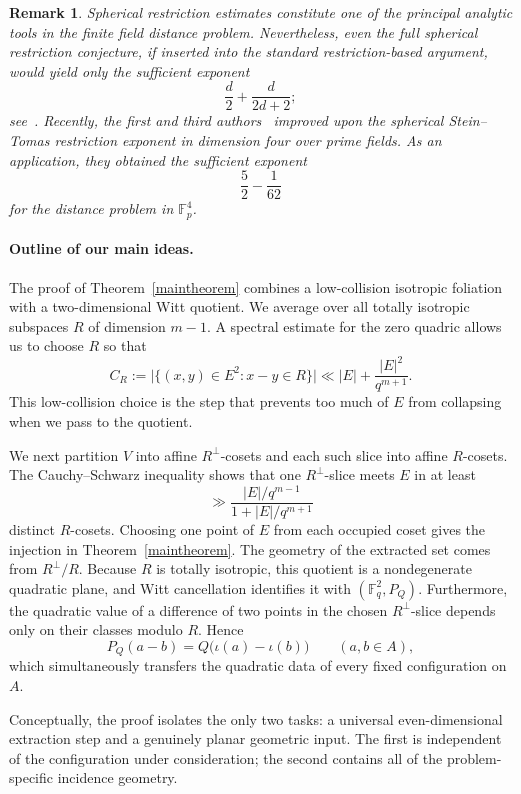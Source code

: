 \documentclass[11pt]{article}
\newtheorem{remark}[theorem]{Remark}
\newcommand{\F}{\mathbb F}
\begin{document}
\begin{remark}
Spherical restriction estimates constitute one of the principal
analytic tools in the finite field distance problem. Nevertheless,
even the full spherical restriction conjecture, if inserted into the
standard restriction-based argument, would yield only the sufficient
exponent
\[
    \frac{d}{2}+\frac{d}{2d+2};
\]
see~\cite{KPV}. Recently, the first and third authors~\cite{PX26}
improved upon the spherical Stein--Tomas restriction exponent in
dimension four over prime fields. As an application, they obtained
the sufficient exponent
\[
    \frac{5}{2}-\frac{1}{62}
\]
for the distance problem in \(\mathbb{F}_p^4\).
\end{remark}


\paragraph{Outline of our main ideas.}
The proof of Theorem~\ref{maintheorem} combines a low-collision isotropic
foliation with a two-dimensional Witt quotient.  We average over all
totally isotropic subspaces \(R\) of dimension \(m-1\).  A spectral
estimate for the zero quadric allows us to choose \(R\) so that
\[
    C_R
    :=
    \bigl|\{(x,y)\in E^2:x-y\in R\}\bigr|
    \ll
    |E|+\frac{|E|^2}{q^{m+1}}.
\]
This low-collision choice is the step that prevents too much of \(E\) from
collapsing when we pass to the quotient.

We next partition \(V\) into affine \(R^\perp\)-cosets and each such slice
into affine \(R\)-cosets.  The Cauchy--Schwarz inequality shows that one
\(R^\perp\)-slice meets \(E\) in at least
\[
    \gg
    \frac{|E|/q^{m-1}}{1+|E|/q^{m+1}}
\]
distinct \(R\)-cosets.  Choosing one point of \(E\) from each occupied
coset gives the injection in Theorem~\ref{maintheorem}.  The geometry of
the extracted set comes from
$
    R^\perp/R.
$
Because \(R\) is totally isotropic, this quotient is a nondegenerate
quadratic plane, and Witt cancellation identifies it with
\((\F_q^2,P_Q)\).  Furthermore, the quadratic value of a difference of
two points in the chosen \(R^\perp\)-slice depends only on their classes
modulo \(R\).  Hence
\[
    P_Q(a-b)
    =
    Q\bigl(\iota(a)-\iota(b)\bigr)
    \qquad(a,b\in A),
\]
which simultaneously transfers the quadratic data of every fixed
configuration on \(A\).

Conceptually, the proof isolates the only two tasks: a universal
even-dimensional extraction step and a genuinely planar geometric input.
The first is independent of the configuration under consideration; the
second contains all of the problem-specific incidence geometry.
\end{document}
